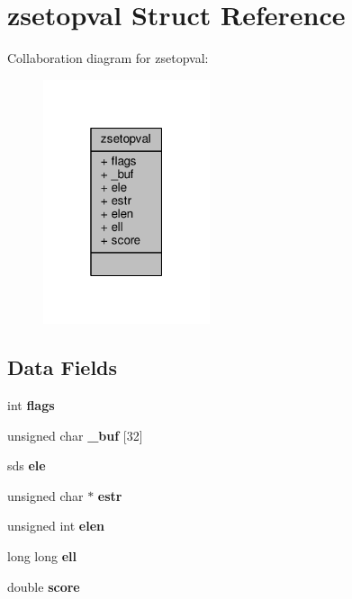 \hypertarget{structzsetopval}{}\section{zsetopval Struct Reference}
\label{structzsetopval}


Collaboration diagram for zsetopval\+:\nopagebreak
\begin{figure}[H]
\begin{center}
\leavevmode
\includegraphics[width=139pt]{structzsetopval__coll__graph}
\end{center}
\end{figure}
\subsection*{Data Fields}
\begin{DoxyCompactItemize}
\item 
\mbox{\label{structzsetopval_ad3b4870e6f1a8c0e4749494e655cbe13}} 
int {\bfseries flags}
\item 
\mbox{\label{structzsetopval_a34e7123e4ee0da8943148e67ec1a0f20}} 
unsigned char {\bfseries \+\_\+buf} \mbox{[}32\mbox{]}
\item 
\mbox{\label{structzsetopval_af9ee5dba4ef86a841f96f55a425a0d34}} 
sds {\bfseries ele}
\item 
\mbox{\label{structzsetopval_a50d9d080aac59d5ee62e387ec08d1e85}} 
unsigned char $\ast$ {\bfseries estr}
\item 
\mbox{\label{structzsetopval_ae2f09f119f4c41277e1e42aa04fffdcd}} 
unsigned int {\bfseries elen}
\item 
\mbox{\label{structzsetopval_acc441f8a17c26657f1dd59d55b524062}} 
long long {\bfseries ell}
\item 
\mbox{\label{structzsetopval_a3a9fa96508b40369da98242a18b04ccd}} 
double {\bfseries score}
\end{DoxyCompactItemize}


